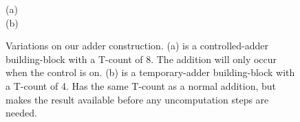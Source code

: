 \documentclass[twocolumn]{revtex4-1}
\begin{document}
\begin{figure}
  (a) 
  \vspace*{0.25cm} \\
  (b) 
  \caption{
	Variations on our adder construction.
	(a) is a controlled-adder building-block with a T-count of 8.
	The addition will only occur when the control is on.
	(b) is a temporary-adder building-block with a T-count of 4.
	Has the same T-count as a normal addition, but makes the result available before any uncomputation steps are needed.
  }
  \label{fig:variations-on-full-adder-block}
\end{figure}
\end{document}
